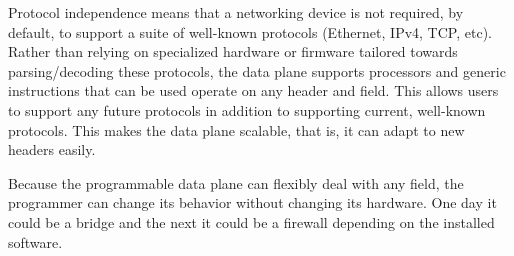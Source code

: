Protocol independence means that a networking device is not required, by default, to support
a suite of well-known protocols (Ethernet, IPv4, TCP, etc).
Rather than relying on specialized hardware or firmware tailored towards
parsing/decoding
these protocols, the data plane supports processors
and generic instructions that can be used operate on
any header and field.
This allows users to support any future protocols in addition to
supporting current, well-known protocols. This makes the data plane scalable, that is, it
can adapt to new headers easily.

Because the programmable data plane can flexibly deal with any field, the programmer can change its behavior without changing its hardware. One day it could be a bridge and the next it could be a firewall depending on the installed software.

%
%




